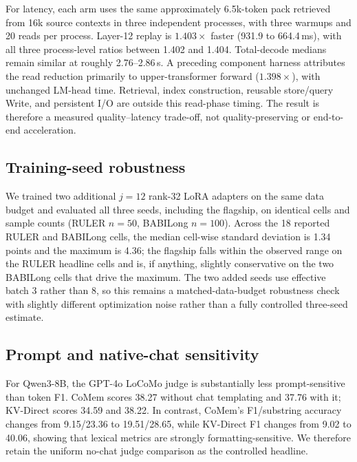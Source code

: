 For latency, each arm uses the same approximately 6.5k-token pack retrieved from
16k source contexts in three independent
processes, with three warmups and 20 reads per process. Layer-12 replay is
$1.403\times$ faster (931.9 to 664.4\,ms), with all three process-level ratios
between 1.402 and 1.404. Total-decode medians remain similar at roughly
2.76--2.86\,s. A preceding component harness attributes the read reduction
primarily to upper-transformer forward ($1.398\times$), with unchanged LM-head
time. Retrieval, index construction, reusable store/query Write, and persistent
I/O are outside this read-phase timing. The result is therefore a measured
quality--latency trade-off, not quality-preserving or end-to-end acceleration.





\subsection{Training-seed robustness}

We trained two additional $j{=}12$ rank-32 LoRA adapters on the same data budget
and evaluated all three seeds, including the flagship, on identical cells and
sample counts (RULER $n{=}50$, BABILong $n{=}100$). Across the 18 reported RULER
and BABILong cells, the median cell-wise standard deviation is 1.34 points and
the maximum is 4.36; the flagship falls within the observed range on the RULER
headline cells and is, if anything, slightly conservative on the two BABILong
cells that drive the maximum. The two added seeds use effective batch 3 rather
than 8, so this remains a matched-data-budget robustness check with slightly
different optimization noise rather than a fully controlled three-seed estimate.

\subsection{Prompt and native-chat sensitivity}

For Qwen3-8B, the GPT-4o LoCoMo judge is substantially less prompt-sensitive
than token F1. CoMem scores 38.27 without chat templating and 37.76 with it;
KV-Direct scores 34.59 and 38.22. In contrast, CoMem's F1/substring accuracy
changes from 9.15/23.36 to 19.51/28.65, while KV-Direct F1 changes from 9.02 to
40.06, showing that lexical metrics are strongly formatting-sensitive. We therefore retain the uniform
no-chat judge comparison as the controlled headline.

